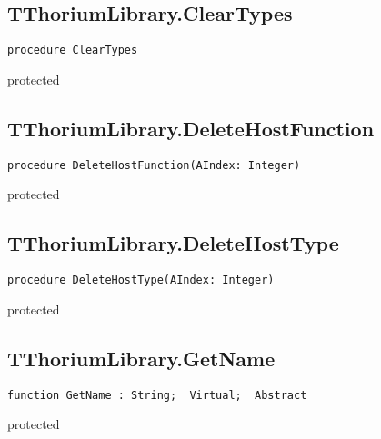 \subsection{TThoriumLibrary.ClearTypes}
\label{thoriumcore:thorium:tthoriumlibrary:cleartypes}
\begin{FPCList}
\Synopsis
\Declaration 

\begin{verbatim}
procedure ClearTypes
\end{verbatim}
\Visibility
protected
\Description
\Errors
\end{FPCList}
\subsection{TThoriumLibrary.DeleteHostFunction}
\label{thoriumcore:thorium:tthoriumlibrary:deletehostfunction}
\begin{FPCList}
\Synopsis
\Declaration 

\begin{verbatim}
procedure DeleteHostFunction(AIndex: Integer)
\end{verbatim}
\Visibility
protected
\Description
\Errors
\end{FPCList}
\subsection{TThoriumLibrary.DeleteHostType}
\label{thoriumcore:thorium:tthoriumlibrary:deletehosttype}
\begin{FPCList}
\Synopsis
\Declaration 

\begin{verbatim}
procedure DeleteHostType(AIndex: Integer)
\end{verbatim}
\Visibility
protected
\Description
\Errors
\end{FPCList}
\subsection{TThoriumLibrary.GetName}
\label{thoriumcore:thorium:tthoriumlibrary:getname}
\begin{FPCList}
\Synopsis
\Declaration 

\begin{verbatim}
function GetName : String;  Virtual;  Abstract
\end{verbatim}
\Visibility
protected
\Description
\Errors
\end{FPCList}
